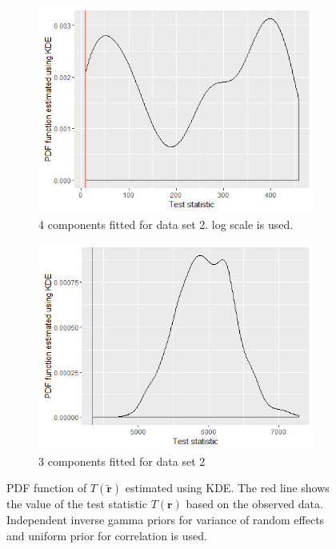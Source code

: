 \begin{figure}[!h]
	\centering
	\captionsetup{justification=centering}
	\begin{subfigure}[b]{0.4\textwidth}
		\includegraphics[width=\textwidth]{mainmatter/chapter_5_simulation_study/indpGammaPrior_ppc_3wellsep4comp.png}
        \caption{\label{fig : ppc_3wellsep4comp_indp_gammaprior}4 components fitted for data set 2. log scale is used.}
	\end{subfigure}
	\begin{subfigure}[b]{0.4\textwidth}
		\includegraphics[width=\textwidth]{mainmatter/chapter_5_simulation_study/indpGammaPrior_ppc_3wellsep3comp.png}
        \caption{\label{fig : ppc_3wellsep3comp_indp_gammaprior}3 components fitted for data set 2}
	\end{subfigure}
	\caption{PDF function of $T(\boldsymbol{\tilde{r}})$ estimated using KDE. The red line shows the value of the test statistic $T(\boldsymbol{r})$ based on the observed data. Independent inverse gamma priors for variance of random effects and uniform prior for correlation is used.}
	\label{fig : ppc_3wellsepcomp_indp_gammaprior}
\end{figure}